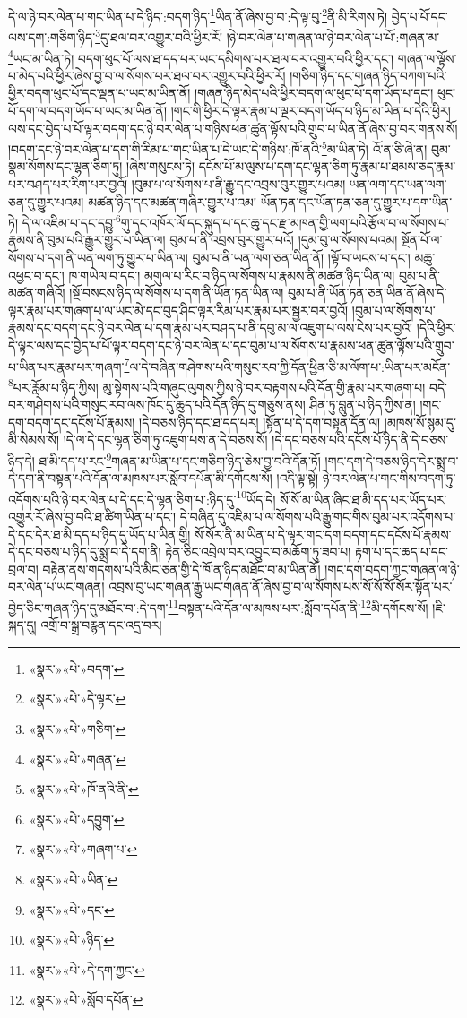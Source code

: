དེ་ལ་ཉེ་བར་ལེན་པ་གང་ཡིན་པ་དེ་ཉིད་:བདག་ཉིད་\footnote{«སྣར་»«པེ་»བདག་}ཡིན་ནོ་ཞེས་བྱ་བ་:དེ་ལྟ་བུ་\footnote{«སྣར་»«པེ་»དེ་ལྟར་}ནི་མི་རིགས་ཏེ། བྱེད་པ་པོ་དང་ལས་དག་:གཅིག་ཉིད་\footnote{«སྣར་»«པེ་»གཅིག་}དུ་ཐལ་བར་འགྱུར་བའི་ཕྱིར་རོ། །ཉེ་བར་ལེན་པ་གཞན་ལ་ཉེ་བར་ལེན་པ་པོ་:གཞན་མ་\footnote{«སྣར་»«པེ་»གཞན་}ཡང་མ་ཡིན་ཏེ། བདག་ཕུང་པོ་ལས་ཐ་དད་པར་ཡང་དམིགས་པར་ཐལ་བར་འགྱུར་བའི་ཕྱིར་དང་། གཞན་ལ་ལྟོས་པ་མེད་པའི་ཕྱིར་ཞེས་བྱ་བ་ལ་སོགས་པར་ཐལ་བར་འགྱུར་བའི་ཕྱིར་རོ། །གཅིག་ཉིད་དང་གཞན་ཉིད་བཀག་པའི་ཕྱིར་བདག་ཕུང་པོ་དང་ལྡན་པ་ཡང་མ་ཡིན་ནོ། །གཞན་ཉིད་མེད་པའི་ཕྱིར་བདག་ལ་ཕུང་པོ་དག་ཡོད་པ་དང་། ཕུང་པོ་དག་ལ་བདག་ཡོད་པ་ཡང་མ་ཡིན་ནོ། །གང་གི་ཕྱིར་དེ་ལྟར་རྣམ་པ་ལྔར་བདག་ཡོད་པ་ཉིད་མ་ཡིན་པ་དེའི་ཕྱིར། ལས་དང་བྱེད་པ་པོ་ལྟར་བདག་དང་ཉེ་བར་ལེན་པ་གཉིས་ཕན་ཚུན་ལྟོས་པའི་གྲུབ་པ་ཡིན་ནོ་ཞེས་བྱ་བར་གནས་སོ། །བདག་དང་ཉེ་བར་ལེན་པ་དག་གི་རིམ་པ་གང་ཡིན་པ་དེ་ཡང་དེ་གཉིས་:ཁོ་ནའི་\footnote{«སྣར་»«པེ་»ཁོ་ནའི་ནི་}མ་ཡིན་ཏེ། འོ་ན་ཅི་ཞེ་ན། བུམ་སྣམ་སོགས་དང་ལྷན་ཅིག་ཏུ། །ཞེས་གསུངས་ཏེ། དངོས་པོ་མ་ལུས་པ་དག་དང་ལྷན་ཅིག་ཏུ་རྣམ་པ་ཐམས་ཅད་རྣམ་པར་བཤད་པར་རིག་པར་བྱའོ། །བུམ་པ་ལ་སོགས་པ་ནི་རྒྱུ་དང་འབྲས་བུར་གྱུར་པའམ། ཡན་ལག་དང་ཡན་ལག་ཅན་དུ་གྱུར་པའམ། མཚན་ཉིད་དང་མཚན་གཞིར་གྱུར་པ་འམ། ཡོན་ཏན་དང་ཡོན་ཏན་ཅན་དུ་གྱུར་པ་དག་ཡིན་ཏེ། དེ་ལ་འཇིམ་པ་དང་དབྱུ་\footnote{«སྣར་»«པེ་»དབྱུག་}གུ་དང་འཁོར་ལོ་དང་སྐུད་པ་དང་ཆུ་དང་རྫ་མཁན་གྱི་ལག་པའི་རྩོལ་བ་ལ་སོགས་པ་རྣམས་ནི་བུམ་པའི་རྒྱུར་གྱུར་པ་ཡིན་ལ། བུམ་པ་ནི་འབྲས་བུར་གྱུར་པའོ། །དུམ་བུ་ལ་སོགས་པའམ། སྔོན་པོ་ལ་སོགས་པ་དག་ནི་ཡན་ལག་ཏུ་གྱུར་པ་ཡིན་ལ། བུམ་པ་ནི་ཡན་ལག་ཅན་ཡིན་ནོ། །ལྟོ་བ་ཡངས་པ་དང་། མཆུ་འཕྱང་བ་དང་། ཁ་གཡེལ་བ་དང་། མགུལ་པ་རིང་བ་ཉིད་ལ་སོགས་པ་རྣམས་ནི་མཚན་ཉིད་ཡིན་ལ། བུམ་པ་ནི་མཚན་གཞིའོ། །སྔོ་བསངས་ཉིད་ལ་སོགས་པ་དག་ནི་ཡོན་ཏན་ཡིན་ལ། བུམ་པ་ནི་ཡོན་ཏན་ཅན་ཡིན་ནོ་ཞེས་དེ་ལྟར་རྣམ་པར་གཞག་པ་ལ་ཡང་མེ་དང་བུད་ཤིང་ལྟར་རིམ་པར་རྣམ་པར་སྦྱར་བར་བྱའོ། །བུམ་པ་ལ་སོགས་པ་རྣམས་དང་བདག་དང་ཉེ་བར་ལེན་པ་དག་རྣམ་པར་བཤད་པ་ནི་དབུ་མ་ལ་འཇུག་པ་ལས་ངེས་པར་བྱའོ། །དེའི་ཕྱིར་དེ་ལྟར་ལས་དང་བྱེད་པ་པོ་ལྟར་བདག་དང་ཉེ་བར་ལེན་པ་དང་བུམ་པ་ལ་སོགས་པ་རྣམས་ཕན་ཚུན་ལྟོས་པའི་གྲུབ་པ་ཡིན་པར་རྣམ་པར་གཞག་\footnote{«སྣར་»«པེ་»གཞག་པ་}ལ་དེ་བཞིན་གཤེགས་པའི་གསུང་རབ་ཀྱི་དོན་ཕྱིན་ཅི་མ་ལོག་པ་:ཡིན་པར་མངོན་\footnote{«སྣར་»«པེ་»ཡིན་}པར་རློམ་པ་ཉིད་ཀྱིས། མུ་སྟེགས་པའི་གཞུང་ལུགས་ཀྱིས་ཉེ་བར་བརྟགས་པའི་དོན་གྱི་རྣམ་པར་གཞག་པ། བདེ་བར་གཤེགས་པའི་གསུང་རབ་ལས་ཁོང་དུ་ཆུད་པའི་དོན་ཉིད་དུ་གཅུས་ནས། ཤིན་ཏུ་བླུན་པ་ཉིད་ཀྱིས་ན། །གང་དག་བདག་དང་དངོས་པོ་རྣམས། །དེ་བཅས་ཉིད་དང་ཐ་དད་པར། །སྟོན་པ་དེ་དག་བསྟན་དོན་ལ། །མཁས་སོ་སྙམ་དུ་མི་སེམས་སོ། །དེ་ལ་དེ་དང་ལྷན་ཅིག་ཏུ་འཇུག་པས་ན་དེ་བཅས་སོ། །དེ་དང་བཅས་པའི་དངོས་པོ་ཉིད་ནི་དེ་བཅས་ཉིད་དེ། ཐ་མི་དད་པ་རང་\footnote{«སྣར་»«པེ་»དང་}གཞན་མ་ཡིན་པ་དང་གཅིག་ཉིད་ཅེས་བྱ་བའི་དོན་ཏོ། །གང་དག་དེ་བཅས་ཉིད་དེར་སྨྲ་བ་དེ་དག་ནི་བསྟན་པའི་དོན་ལ་མཁས་པར་སློབ་དཔོན་མི་དགོངས་སོ། །འདི་ལྟ་སྟེ། ཉེ་བར་ལེན་པ་གང་གིས་བདག་ཏུ་འདོགས་པའི་ཉེ་བར་ལེན་པ་དེ་དང་དེ་ལྷན་ཅིག་པ་:ཉིད་དུ་\footnote{«སྣར་»«པེ་»ཉིད་}ཡོད་དེ། སོ་སོ་མ་ཡིན་ཞིང་ཐ་མི་དད་པར་ཡོད་པར་འགྱུར་རོ་ཞེས་བྱ་བའི་ཐ་ཚིག་ཡིན་པ་དང་། དེ་བཞིན་དུ་འཇིམ་པ་ལ་སོགས་པའི་རྒྱུ་གང་གིས་བུམ་པར་འདོགས་པ་དེ་དང་དེར་ཐ་མི་དད་པ་ཉིད་དུ་ཡོད་པ་ཡིན་གྱི། སོ་སོར་ནི་མ་ཡིན་པ་དེ་ལྟར་གང་དག་བདག་དང་དངོས་པོ་རྣམས་དེ་དང་བཅས་པ་ཉིད་དུ་སྨྲ་བ་དེ་དག་ནི། རྟེན་ཅིང་འབྲེལ་བར་འབྱུང་བ་མཆོག་ཏུ་ཟབ་པ། རྟག་པ་དང་ཆད་པ་དང་བྲལ་བ། བརྟེན་ནས་གདགས་པའི་མིང་ཅན་གྱི་དེ་ཁོ་ན་ཉིད་མཐོང་བ་མ་ཡིན་ནོ། །གང་དག་བདག་ཀྱང་གཞན་ལ་ཉེ་བར་ལེན་པ་ཡང་གཞན། འབྲས་བུ་ཡང་གཞན་རྒྱུ་ཡང་གཞན་ནོ་ཞེས་བྱ་བ་ལ་སོགས་པས་སོ་སོ་སོ་སོར་སྟོན་པར་བྱེད་ཅིང་གཞན་ཉིད་དུ་མཐོང་བ་:དེ་དག་\footnote{«སྣར་»«པེ་»དེ་དག་ཀྱང་}བསྟན་པའི་དོན་ལ་མཁས་པར་:སློབ་དཔོན་ནི་\footnote{«སྣར་»«པེ་»སློབ་དཔོན་}མི་དགོངས་སོ། །ཇི་སྐད་དུ། འགྲོ་བ་སྒྲ་བརྙན་དང་འདྲ་བར། 